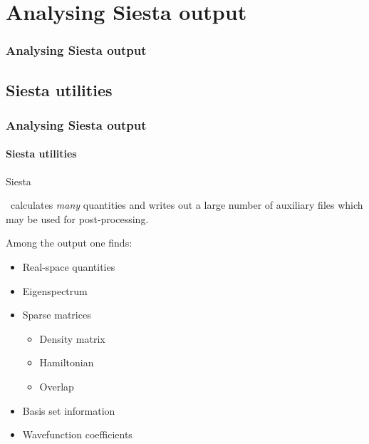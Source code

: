 
\section{Analysing Siesta output}

\begin{frame}
  \frametitle{Analysing Siesta output}
  \tableofcontents[currentsection]
\end{frame}

\subsection{Siesta utilities}

\begin{frame}
  \frametitle{Analysing Siesta output}
  \framesubtitle{Siesta utilities}

  \begin{block}{Siesta}

    \siesta\ calculates \emph{many} quantities and writes out a large number of auxiliary
    files which may be used for post-processing.

    Among the output one finds:
    \begin{itemize}
      \item Real-space quantities
      \item Eigenspectrum
      \item Sparse matrices
      \begin{itemize}
        \item Density matrix
        \item Hamiltonian
        \item Overlap
      \end{itemize}
      \item Basis set information
      \item Wavefunction coefficients
    \end{itemize}
    
  \end{block}
  
\end{frame}


